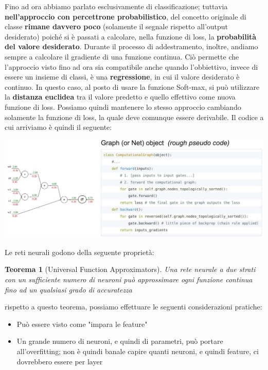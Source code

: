 \documentclass[12pt]{article}
\newtheorem{Teorema}{Teorema}[subsection]
\begin{document}
Fino ad ora abbiamo parlato esclusivamente di classificazione; tuttavia \textbf{nell'approccio con percettrone probabilistico}, del concetto originale di classe \textbf{rimane davvero poco} (solamente il segnale rispetto all'output desiderato) poiché si è passati
a calcolare, nella funzione di loss, la \textbf{probabilità del valore desiderato}. Durante il processo di addestramento, inoltre, andiamo sempre a calcolare il gradiente di una funzione continua.
Ciò permette che l'approccio visto fino ad ora sia compatibile anche quando l'obbiettivo, invece di essere un insieme di classi, è una \textbf{regressione}, in cui il valore desiderato è continuo.
In questo caso, al posto di usare la funzione Soft-max, si può utilizzare la \textbf{distanza euclidea} tra il valore predetto e quello effettivo come nuova funzione di loss.
Possiamo quindi mantenere lo stesso approccio cambiando solamente la funzione di loss, la quale deve comunque essere derivabile.
Il codice a cui arriviamo è quindi il seguente:
\begin{center}
    \includegraphics[width =1\linewidth]{Images/130.PNG}
\end{center}
Le reti neurali godono della seguente proprietà:
\begin{Teorema}[Universal Function Approximators]
    Una rete neurale a due strati con un sufficiente numero di neuroni può approssimare ogni funzione continua fino ad un qualsiasi grado di accuratezza
\end{Teorema}
rispetto a questo teorema, possiamo effettuare le seguenti considerazioni pratiche:
\begin{itemize}
    \item Può essere visto come "impara le feature"
    \item Un grande numero di neuroni, e quindi di parametri, può portare all'overfitting; non è quindi banale capire quanti neuroni, e quindi feature, ci dovrebbero essere per layer
\end{itemize}
\end{document}
